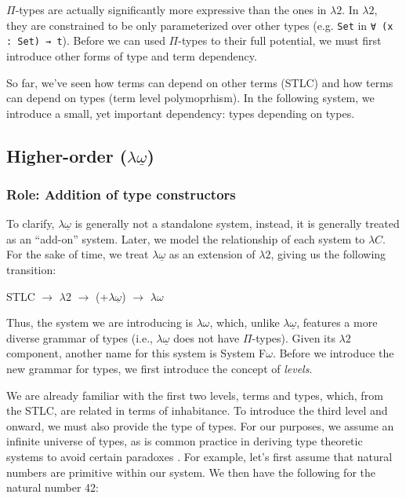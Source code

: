 \documentclass[12pt]{article}
\begin{document}
\(\Pi\)-types are actually significantly more expressive than the ones in
\(\lambda2\). In \(\lambda2\), they are constrained to be only parameterized
over other types (e.g. {\tt Set} in {\tt ∀ (x : Set) → t}). Before we can used
\(\Pi\)-types to their full potential, we must first introduce other forms of
type and term dependency.

So far, we've seen how terms can depend on other terms (STLC) and how terms can
depend on types (term level polymoprhism). In the following system, we introduce
a small, yet important dependency: types depending on types.

\subsection*{Higher-order (\(\lambda\underline{\omega}\))}
\subsubsection*{Role: Addition of type constructors}

To clarify, \(\lambda\underline{\omega}\) is generally not a standalone system,
instead, it is generally treated as an ``add-on'' system. Later, we model the
relationship of each system to \(\lambda C\). For the sake of time, we treat
\(\lambda\underline{\omega}\) as an extension of \(\lambda2\), giving us the
following transition:

\begin{center}
\begin{minipage}{0.4\textwidth}
STLC \(\rightarrow\) \(\lambda2\) \(\rightarrow\) (+\(\lambda\underline{\omega}\)) \(\rightarrow\) \(\lambda\omega\)
\end{minipage}
\end{center}

Thus, the system we are introducing is \(\lambda\omega\), which, unlike
\(\lambda\underline{\omega}\), features a more diverse grammar of types (i.e.,
\(\lambda\underline{\omega}\) does not have \(\Pi\)-types). Given its \(\lambda2\)
component, another name for this system is System F\(\omega\). Before we introduce
the new grammar for types, we first introduce the concept of {\em levels}.

We are already familiar with the first two levels, terms and types, which, from
the STLC, are related in terms of inhabitance. To introduce the third level and
onward, we must also provide the type of types. For our purposes, we assume an
infinite universe of types, as is common practice in deriving type theoretic
systems to avoid certain paradoxes \cite{}. For example, let's first assume that
natural numbers are primitive within our system. We then have the following for
the natural number 42:
\end{document}
